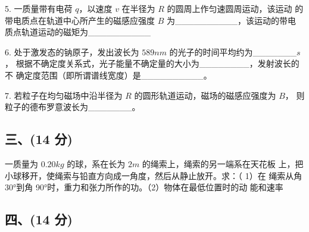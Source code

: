 5. 一质量带有电荷 $q$，以速度 $v$ 在半径为 $R$ 的圆周上作匀速圆周运动，该运动
的带电质点在轨道中心所产生的磁感应强度 $B$ 为__________，该运动的带电
质点轨道运动的磁矩为__________

6. 处于激发态的钠原子，发出波长为 $589nm$ 的光子的时间平均约为_______$s$，
根据不确定度关系式，光子能量不确定量的大小为________，发射波长的不
确定度范围（即所谓谱线宽度）是__________。

7. 若粒子在均匀磁场中沿半径为 $R$ 的圆形轨道运动，磁场的磁感应强度为 $B$，
则粒子的德布罗意波长为_______。
\subsection{三、(14 分)}
一质量为 $0.20kg$ 的球，系在长为 $2m$ 的绳索上，绳索的另一端系在天花板
上，把小球移开，使绳索与铅直方向成一角度，然后从静止放开。求：（ 1）在
绳索从角 30°到角 90°时，重力和张力所作的功。（2）物体在最低位置时的动
能和速率
\subsection{四、(14 分)}
